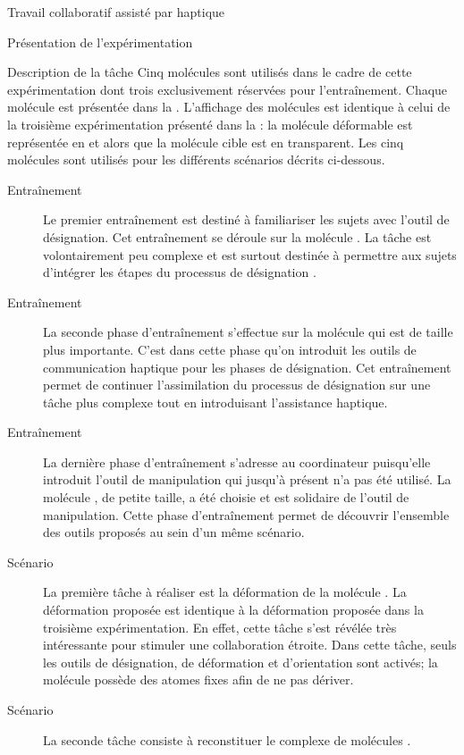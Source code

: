 \documentclass[myfrancais,ngerman,english,frenchb]{mythesis}
\begin{document}
\begin{mychapter}{Travail collaboratif assisté par haptique}
\begin{mysection}{Présentation de l'expérimentation}
\begin{mysubsection}{Description de la tâche}
				Cinq molécules sont utilisés dans le cadre de cette expérimentation dont trois exclusivement réservées pour l'entraînement.
				Chaque molécule est présentée dans la .
				L'affichage des molécules est identique à celui de la troisième expérimentation présenté dans la  : la molécule déformable est représentée en \myCPK et \myNewRibbon alors que la molécule cible est en \myNewRibbon transparent.
				Les cinq molécules sont utilisés pour les différents scénarios décrits ci-dessous.
				\begin{description}
					\item[Entraînement~]
						Le premier entraînement est destiné à familiariser les sujets avec l'outil de désignation.
						Cet entraînement se déroule sur la molécule \myTRPCAGE.
						La tâche est volontairement peu complexe et est surtout destinée à permettre aux sujets d'intégrer les étapes du processus de désignation .
					\item[Entraînement~]
						La seconde phase d'entraînement s'effectue sur la molécule \myPrion qui est de taille plus importante.
						C'est dans cette phase qu'on introduit les outils de communication haptique pour les phases de désignation.
						Cet entraînement permet de continuer l'assimilation du processus de désignation sur une tâche plus complexe tout en introduisant l'assistance haptique.
					\item[Entraînement~]
						La dernière phase d'entraînement s'adresse au coordinateur puisqu'elle introduit l'outil de manipulation qui jusqu'à présent n'a pas été utilisé.
						La molécule \myTRPZIPPER, de petite taille, a été choisie et est solidaire de l'outil de manipulation.
						Cette phase d'entraînement permet de découvrir l'ensemble des outils proposés au sein d'un même scénario.
					\item[Scénario~]
						La première tâche à réaliser est la déformation de la molécule \myUbiquitin.
						La déformation proposée est identique à la déformation proposée dans la troisième expérimentation.
						En effet, cette tâche s'est révélée très intéressante pour stimuler une collaboration étroite.
						Dans cette tâche, seuls les outils de désignation, de déformation et d'orientation sont activés; la molécule \myUbiquitin possède des atomes fixes afin de ne pas dériver.
					\item[Scénario~]
						La seconde tâche consiste à reconstituer le complexe de molécules \myNusENusG.

\end{description}
\end{mysubsection}
\end{mysection}
\end{mychapter}
\end{document}
